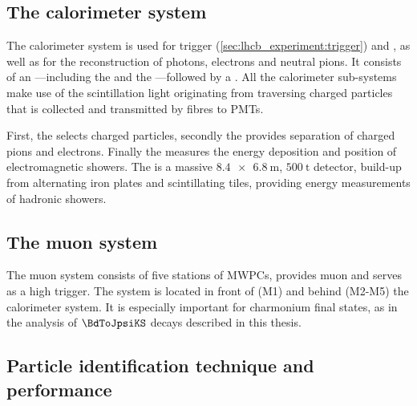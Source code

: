\subsection{The calorimeter system}
\label{sec:lhcb_experiment:pid:calo}

The \LHCb calorimeter system is used for trigger
(\cref{sec:lhcb_experiment:trigger}) and \PID, as well as for the reconstruction
of photons, electrons and neutral pions. It consists of an
\ECAL---including the \SPD and the \PS---followed by a \HCAL. All the
calorimeter sub-systems make use of the scintillation light originating from
traversing charged particles that is collected and transmitted by fibres to
\acp{PMT}.

First, the \SPD selects charged particles, secondly the \PS provides separation
of charged pions and electrons. Finally the \ECAL measures the energy deposition
and position of electromagnetic showers. The \HCAL is a massive
$\SI[product-units = power]{8.4 x 6.8}{\metre}$, $\SI{500}{\tonne}$
detector, build-up from alternating iron plates and scintillating tiles,
providing energy measurements of hadronic showers.

\subsection{The muon system}
\label{sec:lhcb_experiment:pid:muon}

The muon system consists of five stations of \acp{MWPC}, provides muon \PID and
serves as a high \pT trigger. The system is located in front of (M1) and behind
(M2-M5) the calorimeter system. It is especially important for charmonium final
states, as in the analysis of $\BdToJpsiKS$ decays described in this thesis.

\subsection{Particle identification technique and performance}
\label{sec:lhcb_experiment:pid:techniques_and_performance}

